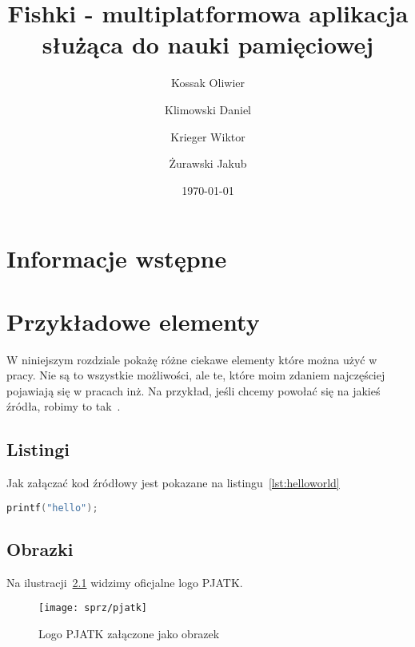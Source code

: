 \documentclass{sprz}
\title{Fishki - multiplatformowa aplikacja służąca do nauki pamięciowej}
\author{Kossak Oliwier}{s22018}{Sztuczna Inteligencja}{Niestacjonarny}
\author{Klimowski Daniel}{s18504}{Sztuczna Inteligencja}{Niestacjonarny}
\author{Krieger Wiktor}{s23638}{Sztuczna Inteligencja}{Niestacjonarny}
\author{Żurawski Jakub}{s23047}{Sztuczna Inteligencja}{Niestacjonarny}
\date{\today}
\begin{document}
    \maketitle

    \makeprojectcard
    \makedeclaration

    \tableofcontents

    \chapter{Informacje wstępne}

    

    

    

    \chapter{Przykładowe elementy}

    W niniejszym rozdziale pokażę różne ciekawe elementy które można użyć w pracy. Nie są to wszystkie możliwości, ale te, które moim zdaniem najczęściej pojawiają się w pracach inż. Na przykład, jeśli chcemy powołać się na jakieś źródła, robimy to tak~\cite{BEHESHTIROUI2021107419}.

    \section{Listingi}

    Jak załączać kod źródłowy jest pokazane na listingu~\ref{lst:helloworld}


    \begin{lstlisting}[language=c,caption={Przykładowy witaj w świecie}, label={lst:helloworld}]
printf("hello");
    \end{lstlisting}

    \section{Obrazki}

    Na ilustracji~\ref{img:pjatklogo} widzimy oficjalne logo PJATK.

    \begin{figure}[h]
        \centering
        \texttt{[image: sprz/pjatk]}
        \caption{Logo PJATK załączone jako obrazek}
        \label{img:pjatklogo}
    \end{figure}
\end{document}
